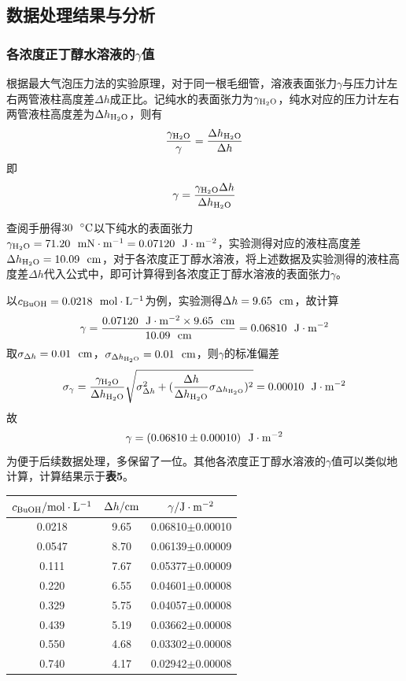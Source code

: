 \documentclass[12pt]{article}
\begin{document}
 

 \subsection{数据处理结果与分析}
 \subsubsection{各浓度正丁醇水溶液的$\gamma$值}
 根据最大气泡压力法的实验原理，对于同一根毛细管，溶液表面张力$\gamma$与压力计左右两管液柱高度差$\Delta h$成正比。记纯水的表面张力为$\gamma_{\rm H_{2}O}$，纯水对应的压力计左右两管液柱高度差为$\Delta h_{\rm H_{2}O}$，则有
 $$
 \frac{\gamma_{\rm H_{2}O}}{\gamma}=\frac{\Delta h_{\rm H_{2}O}}{\Delta h}
 $$
 即
 $$
 \gamma=\frac{\gamma_{\rm H_{2}O} \Delta h}{\Delta h_{\rm H_{2}O}}
 $$
 \par 
 查阅手册\citealp{crc}得$30\ \ {\rm ^{\circ }C}$以下纯水的表面张力$\gamma_{\rm H_{2}O}=71.20\ \ {\rm mN\cdot m^{-1}=0.07120\ \ {\rm J\cdot m^{-2}}}$，实验测得对应的液柱高度差$\Delta h_{\rm H_{2}O}=10.09\ \ {\rm cm}$，对于各浓度正丁醇水溶液，将上述数据及实验测得的液柱高度差$\Delta h$代入公式中，即可计算得到各浓度正丁醇水溶液的表面张力$\gamma$。\par 
 以$c_{\rm BuOH}=0.0218\ \ {\rm mol\cdot L^{-1}}$为例，实验测得$\Delta h=9.65 \ \ {\rm cm}$，故计算
 $$
 \gamma=\frac{0.07120\ \ {\rm J\cdot m^{-2}} \times 9.65 \ \ {\rm cm}}{10.09\ \ {\rm cm}}=0.06810\ \ {\rm J\cdot m^{-2}}
 $$
 取$\sigma_{\Delta h}=0.01\ \ {\rm cm}$，$\sigma_{\Delta h_{\rm H_{2}O}}=0.01\ \ {\rm cm}$，则$\gamma$的标准偏差
 $$
 \sigma_{\gamma}=\frac{\gamma_{\rm H_{2}O}}{\Delta h_{\rm H_{2}O}}\sqrt{\sigma_{\Delta h}^{2}+(\frac{\Delta h}{\Delta h_{\rm H_{2}O}} \sigma_{\Delta h_{\rm H_{2}O}})^{2}}=0.00010\ \ {\rm J\cdot m^{-2}}
 $$
 故$$
 \gamma=(0.06810\pm 0.00010)\ \ {\rm J\cdot m^{-2}}
 $$
 为便于后续数据处理，多保留了一位。其他各浓度正丁醇水溶液的$\gamma$值可以类似地计算，计算结果示于\textbf{表5}。
 \begin{table}[h]
 	\centering
 	\begin{tabular}{ccc}
 		\toprule
 		$c_{\rm BuOH}/{\rm mol\cdot L^{-1}}$ & $\Delta h / {\rm cm}$ & $\gamma/{\rm J\cdot m^{-2}}$\\
 		\midrule
 		0.0218 & 9.65 & 0.06810$\pm$0.00010 \\
 		0.0547 & 8.70 & 0.06139$\pm$0.00009\\
 		0.111 & 7.67 &  0.05377$\pm$0.00009\\
 		0.220 & 6.55 & 0.04601$\pm$0.00008\\
 		0.329 & 5.75 & 0.04057$\pm$0.00008\\
 		0.439 & 5.19 & 0.03662$\pm$0.00008\\
 		0.550 & 4.68 & 0.03302$\pm$0.00008\\
 		0.740 & 4.17 & 0.02942$\pm$0.00008\\
 		\bottomrule
 	\end{tabular}
 \end{table}
\end{document}
